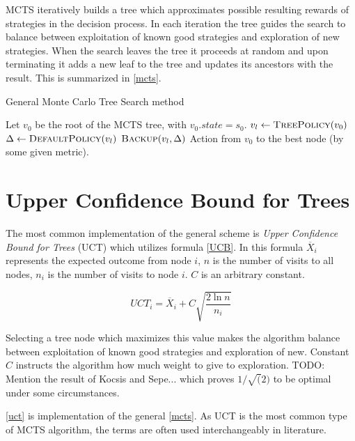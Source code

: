 MCTS iteratively builds a tree which approximates possible resulting
rewards of strategies in the decision process. In each iteration the
tree guides the search to balance between exploitation of known good
strategies and exploration of new strategies. When the search leaves the
tree it proceeds at random and upon terminating it adds a new leaf to
the tree and updates its ancestors with the result. This is summarized
in \autoref{mcts}.


\begin{algorithm}
\caption{General Monte Carlo Tree Search method}
\label{mcts}
\begin{algorithmic}
    \State Let $v_0$ be the root of the MCTS tree, with $v_0.state = s_0$.
        \State $v_l \gets \Call{TreePolicy}{v_0}$
        \State $\Delta \gets \Call{DefaultPolicy}{v_l}$
        \State $\Call{Backup}{v_l, \Delta}$
    \EndWhile
    \State \Return Action from $v_0$ to the best node (by some
    given metric).
\EndFunction
\end{algorithmic}
\end{algorithm}

\section{Upper Confidence Bound for Trees}

The most common implementation of the general scheme is {\em Upper
Confidence Bound for Trees} (UCT) which utilizes formula \ref{UCB}.
In this formula $\overline{X}_i$ represents the expected outcome
from node $i$, $n$ is the number of visits to all nodes, $n_i$ is the
number of visits to node $i$. $C$ is an arbitrary constant.

\begin{equation}
\label{UCB}
UCT_i = \overline{X}_i + C \sqrt{ \frac{2 \ln n}{n_i} }
\end{equation}

Selecting a tree node which maximizes this value makes the algorithm balance
between exploitation of known good strategies and exploration of new.
Constant $C$ instructs the algorithm how much weight to give to
exploration. TODO: Mention the result of Kocsis and Sepe... which proves
$1/\sqrt(2)$ to be optimal under some circumstances.

\autoref{uct} is implementation of the general \autoref{mcts}. As UCT is
the most common type of MCTS algorithm, the terms are often used
interchangeably in literature.

